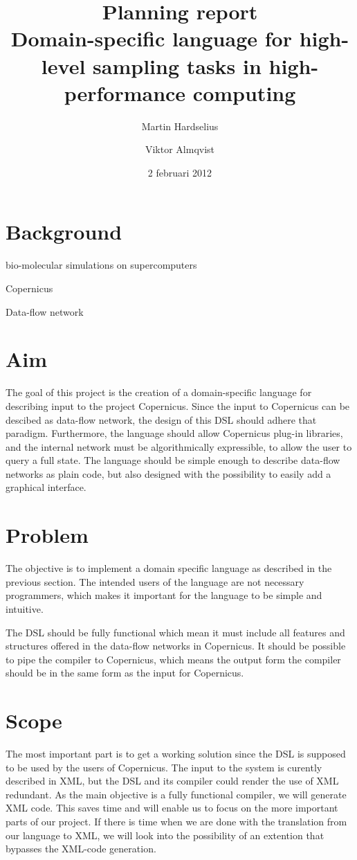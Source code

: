 \documentclass[a4paper]{article}
\title{Planning report\\
  \large{Domain-specific language for high-level
  sampling tasks in high-performance computing
  }
}
\author{Martin Hardselius \and Viktor Almqvist}
\date{2 februari 2012}
\begin{document}
\maketitle
\newpage

\section{Background}

bio-molecular simulations on supercomputers

Copernicus

Data-flow network

\section{Aim}
The goal of this project is the creation of a domain-specific language
for describing input to the project Copernicus. Since the input to
Copernicus can be descibed as data-flow network, the design of this
DSL should adhere that paradigm. Furthermore, the language should
allow Copernicus plug-in libraries, and the internal network must be
algorithmically expressible, to allow the user to query a full
state. The language should be simple enough to describe data-flow
networks as plain code, but also designed with the possibility to
easily add a graphical interface.

\section{Problem}

The objective is to implement a domain specific language as described
in the previous section. The intended users of the language are not
necessary programmers, which makes it important for the language to be
simple and intuitive.

The DSL should be fully functional which mean it must include all
features and structures offered in the data-flow networks in
Copernicus. It should be possible to pipe the compiler to Copernicus,
which means the output form the compiler should be in the same form as
the input for Copernicus.


\section{Scope}
The most important part is to get a working solution since the DSL is
supposed to be used by the users of Copernicus. The input to the
system is curently described in XML, but the DSL and its compiler
could render the use of XML redundant. As the main objective is a
fully functional compiler, we will generate XML code. This saves time
and will enable us to focus on the more important parts of our
project. If there is time when we are done with the translation from
our language to XML, we will look into the possibility of an extention
that bypasses the XML-code generation.
\end{document}
